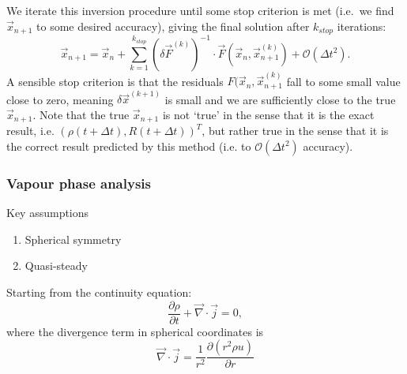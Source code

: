 \documentclass[12pt]{report}
\begin{document}
We iterate this inversion procedure until some stop criterion is met (i.e.\ we find $\vec{x}_{n+1}$ to some desired accuracy), giving the final solution after $k_{stop}$ iterations:
\begin{equation}
  \vec{x}_{n+1} =
  \vec{x}_n + \sum_{k=1}^{k_{stop}}
  (\delta \vec{F}^{(k)})^{-1} \cdot \vec{F}(\vec{x}_n, \vec{x}_{n+1}^{(k)})
  + \mathcal{O}(\Delta t^2).
\end{equation}
A sensible stop criterion is that the residuals $F(\vec{x}_n, \vec{x}_{n+1}^{(k)}$ fall to some small value close to zero, meaning $\delta\vec{x}^{(k+1)}$ is small and we are sufficiently close to the true $\vec{x}_{n+1}$.
Note that the true $\vec{x}_{n+1}$ is not `true' in the sense that it is the exact result, i.e. $(\rho(t + \Delta t), R(t + \Delta t))^T$, but rather true in the sense that it is the correct result predicted by this method (i.e. to $\mathcal{O}(\Delta t^2)$ accuracy).

\subsubsection{Vapour phase analysis}

Key assumptions
\begin{enumerate}
\item Spherical symmetry
\item Quasi-steady
\end{enumerate}

Starting from the continuity equation:
\begin{equation}\label{eq:continuity-eqn}
  \frac{\partial \rho}{\partial t}
  + \vec{\nabla} \cdot \vec{j} = 0,
\end{equation}
where the divergence term in spherical coordinates is
\begin{equation}
  \vec{\nabla} \cdot \vec{j} =
  \frac{1}{r^2} \frac{\partial (r^2 \rho u)}{\partial r}
\end{equation}
\end{document}
